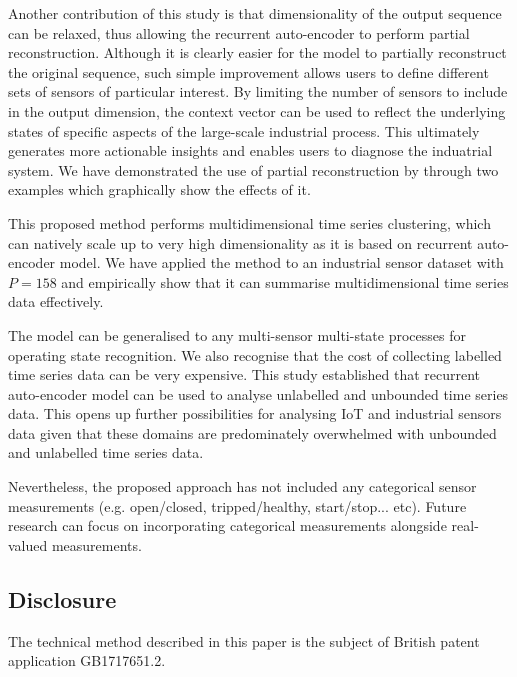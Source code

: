 \documentclass[runningheads]{llncs}
\begin{document}
Another contribution of this study is that dimensionality of the output sequence can be relaxed, thus allowing the recurrent auto-encoder to perform partial reconstruction. Although it is clearly easier for the model to partially reconstruct the original sequence, such simple improvement allows users to define different sets of sensors of particular interest. By limiting the number of sensors to include in the output dimension, the context vector can be used to reflect the underlying states of specific aspects of the large-scale industrial process. This ultimately generates more actionable insights and enables users to diagnose the induatrial system. We have demonstrated the use of partial reconstruction by through two examples which graphically show the effects of it.

This proposed method performs multidimensional time series clustering, which can natively scale up to very high dimensionality as it is based on recurrent auto-encoder model. We have applied the method to an industrial sensor dataset with \(P=158\) and empirically show that it can summarise multidimensional time series data effectively.

The model can be generalised to any multi-sensor multi-state processes for operating state recognition. We also recognise that the cost of collecting labelled time series data can be very expensive. This study established that recurrent auto-encoder model can be used to analyse unlabelled and unbounded time series data. This opens up further possibilities for analysing IoT and industrial sensors data given that these domains are predominately overwhelmed with unbounded and unlabelled time series data.

Nevertheless, the proposed approach has not included any categorical sensor measurements (e.g. open/closed, tripped/healthy, start/stop... etc). Future research can focus on incorporating categorical measurements alongside real-valued measurements.


\subsection*{Disclosure}

The technical method described in this paper is the subject of British patent application GB1717651.2.
\end{document}
